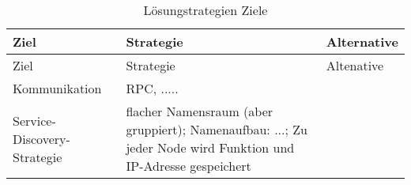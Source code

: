 \begin{longtable}{|>{\raggedright\arraybackslash}p{4cm}|>{\raggedright\arraybackslash}p{5cm}|>{\raggedright\arraybackslash}p{5cm}|}
	\caption{Lösungstrategien Ziele} \label{tab:loesungsstrategieZiele} \\
	\hline
	Ziel & Strategie & Alternative\\
	\hline
	\endfirsthead
	
	\hline
	Ziel & Strategie & Altenative\\
	\hline
	\endhead
	
	\hline
	\endfoot
	
	
	Kommunikation
	& RPC, ..... 
	& 
	\\
	\hline
	Service-Discovery-Strategie
	& flacher Namensraum (aber gruppiert); Namenaufbau: ...; Zu jeder Node wird Funktion und IP-Adresse gespeichert
	& 
	\\
	\hline

	
\end{longtable}


